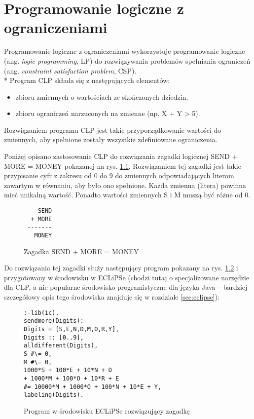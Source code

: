 \chapter{Programowanie logiczne z ograniczeniami}

\label{sec:clp}

Programowanie logiczne z ograniczeniami \cite{CLP} wykorzystuje programowanie logiczne (ang. \textit{logic programming}, LP) do rozwiązywania problemów spełniania ograniczeń (ang. \textit{constraint satisfaction problem}, CSP). 
\\*
Program CLP składa się z następujących elementów:
\begin{itemize}
\item{zbioru zmiennych o wartościach ze skończonych dziedzin,}
\item{zbioru ograniczeń narzuconych na zmienne (np. X + Y > 5).}
\end{itemize}

Rozwiązaniem programu CLP jest takie przyporządkowanie wartości do zmiennych, aby spełnione zostały wszystkie zdefiniowane ograniczenia.

Poniżej opisano zastosowanie CLP do rozwiązania zagadki logicznej SEND + MORE  = MONEY \cite{Eclipse} pokazanej na rys. \ref{fig:sendmoremoney}. Rozwiązaniem tej zagadki jest takie przypisanie cyfr z zakresu od 0 do 9 do zmiennych odpowiadających literom zawartym w równaniu, aby było ono spełnione. Każda zmienna (litera) powinna mieć unikalną wartość. Ponadto wartości zmiennych S i M muszą być różne od 0.

\begin{figure}[H]
\begin{center}
\begin{verbatim}
    SEND
  + MORE
 -------
   MONEY
\end{verbatim}
\end{center}
\caption{Zagadka SEND + MORE = MONEY}
\label{fig:sendmoremoney}
\end{figure}

Do rozwiązania tej zagadki służy następujący program pokazany na rys. \ref{fig:eclipse_program} i przygotowany w środowisku w ECLiPSe (chodzi tutaj o specjalizowane narzędzie dla CLP, a nie popularne środowisko programistyczne dla języka Java -- bardziej szczegółowy opis tego środowiska znajduje się w rozdziale \ref{sec:eclipse}):

\begin{figure}[H]
\begin{verbatim}
:-lib(ic).
sendmore(Digits):-
Digits = [S,E,N,D,M,O,R,Y],
Digits :: [0..9],
alldifferent(Digits),
S #\= 0,
M #\= 0,
1000*S + 100*E + 10*N + D
+ 1000*M + 100*O + 10*R + E
#= 10000*M + 1000*O + 100*N + 10*E + Y,
labeling(Digits).
\end{verbatim}
\caption{Program w środowisku ECLiPSe rozwiązujący zagadkę}
\label{fig:eclipse_program}
\end{figure}

